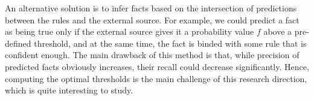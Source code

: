 An alternative solution is to infer facts based on the intersection of predictions between the rules and the external source. For example, we could predict a fact as being true only if the external source gives it a probability value $f$ above a pre-defined threshold, and at the same time, the fact is binded with some rule that is confident enough. The main drawback of this method is that, while precision of predicted facts obviously increases, their recall could decrease significantly. Hence, computing the optimal thresholds is the main challenge of this research direction, which is quite interesting to study.







